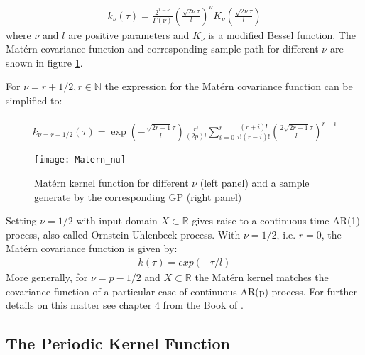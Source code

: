 \begin{gather*}
    k_{\nu}(\tau) = \frac{2^{1-\nu}}{\Gamma(\nu)}(\frac{\sqrt{2\nu} \tau}{l})^{\nu} K_{\nu}
    (\frac{\sqrt{2\nu} \tau}{l})
\end{gather*}
where $\nu$ and $l$ are positive parameters and $K_{\nu}$ is a modified Bessel
function. The Matérn covariance function and corresponding sample path for different
$\nu$ are shown in figure \ref{fig:matern}.

For $\nu = r + 1/2, r \in \mathbb{N}$ the expression for the Matérn covariance
function can be simplified to:

\begin{gather}\label{kernel-matern}
    k_{\nu=r+1/2}(\tau) = \exp(-\frac{\sqrt{2r + 1} \tau}{l}) \frac{r!}{(2p)!}
    \sum_{i=0}^{r} \frac{(r+i)!}{i!(r-i)!}(\frac{2 \sqrt{2 r + 1} \tau}{l})^{r-i}
\end{gather}

\begin{figure}[!hbt]%
  \centering
  \texttt{[image: Matern\_nu]} %
  \caption[Matérn Kernel: Kernel function wiht sample path]%
   {Matérn kernel function for different $\nu$ (left panel) and a sample
    generate by the corresponding GP (right panel)}
  \label{fig:matern}
\end{figure}


Setting $\nu = 1/2$ with input domain $X \subset \mathbb{R}$ gives raise to a continuous-time AR(1) process,
also called Ornstein-Uhlenbeck process.
With $\nu = 1/2$, i.e. $r=0$, the Matérn covariance function is given by:
\begin{gather}\label{kernel-matern-ar1}
    k(\tau) = exp(- \tau/l)
\end{gather}
More generally, for $\nu = p - 1/2$ and $X \subset \mathbb{R}$ the Matérn kernel
matches the covariance function of a particular case of continuous AR(p) process.
For further details on this matter
see chapter 4 from the Book of \citeauthor{rasmussen_gaussian_2006}.


\subsection{The Periodic Kernel Function}


